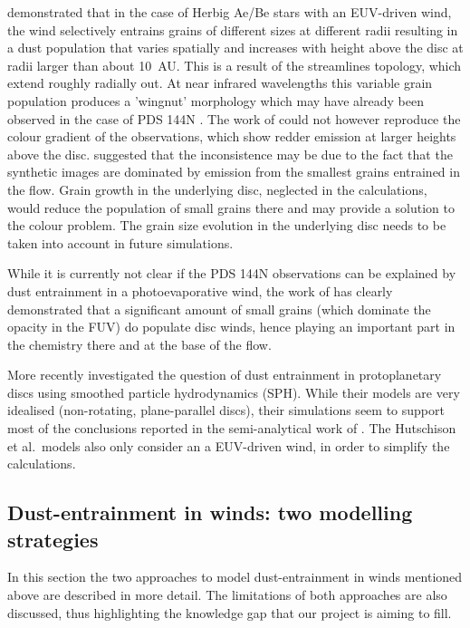 \documentclass[10pt,fleqn,twoside]{article}
\begin{document}
\citet{2011MNRAS.411.1104O} demonstrated that in the case of
Herbig Ae/Be stars with an EUV-driven wind, the wind selectively entrains
grains of different sizes at different radii resulting in a dust
population that varies spatially and increases with height above the
disc at radii larger than about 10~AU. This is a  result of the
streamlines topology, which extend roughly radially out. At near
infrared wavelengths 
this variable grain population produces a 'wingnut' morphology which
may have already been observed in the case of PDS 144N 
\citep{2006ApJ...645.1272P}. The work of \citet{2011MNRAS.411.1104O} could not however reproduce the
colour gradient of the observations, which show redder emission at
larger heights above the disc. \citet{2011MNRAS.411.1104O} suggested that the
inconsistence may be due to the
fact that the synthetic images are dominated by emission from the
smallest grains entrained in the flow. Grain growth in the underlying
disc, neglected in the
\citet{2011MNRAS.411.1104O} calculations, would reduce the population of
small grains there and may provide a solution to
the colour problem. The grain size evolution in the underlying disc
needs to be taken into account in future simulations. 

While it is currently not clear if the PDS 144N observations can be
explained by dust entrainment in a photoevaporative wind, the work of
\citet{2011MNRAS.411.1104O} has clearly demonstrated that a
significant amount of small grains (which dominate the opacity in the
FUV) do populate disc winds, hence playing an important part in the
chemistry there and at the base of the flow. 

More recently \citet{2016MNRAS.463.2725H, 2016MNRAS.461..742H}
investigated the question of
dust entrainment in protoplanetary discs using smoothed particle
hydrodynamics (SPH). While their models are very idealised (non-rotating,
plane-parallel discs), their simulations seem to support most of the
conclusions reported in the semi-analytical work of \citet{2011MNRAS.411.1104O}. 
The Hutschison et al.\ models also only consider an a
EUV-driven wind, in order to simplify the calculations.  

\subsection{Dust-entrainment in winds: two modelling strategies}

In this section the two approaches to model dust-entrainment in
winds mentioned above are described in more detail. The limitations of
both approaches are also discussed, thus highlighting the knowledge
gap that our project is aiming to fill. 
\end{document}

